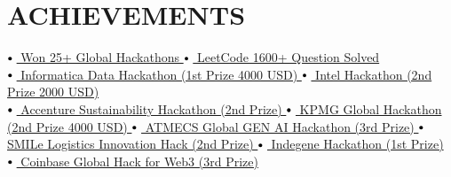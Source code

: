 \documentclass[letterpaper,10pt]{article}
\newcommand\sbullet[1][.5]{\mathbin{\vcenter{\hbox{\scalebox{#1}{$\bullet$}}}}}
\begin{document}
\section{ACHIEVEMENTS}
\noindent

$\sbullet[.75] \hspace{0.1cm}${\href{https://www.hackerearth.com/@raj713335/}{ Won 25+ Global Hackathons \faExternalLink}} \hspace{4.4cm}
$\sbullet[.75] \hspace{0.1cm}${\href{https://leetcode.com/u/raj713335/}{ LeetCode 1600+ Question Solved \faExternalLink}} \\
$\sbullet[.75] \hspace{0.1cm}${\href{https://hack2skill.com/hack/informatica-deh-2024}{ Informatica Data Hackathon (1st Prize 4000 USD) \faExternalLink}} \hspace{1.05cm}
$\sbullet[.75] \hspace{0.1cm}${\href{https://www.hackerearth.com/challenges/hackathon/intel-oneapi-hackathon-for-open-innovation/}{ Intel Hackathon (2nd Prize 2000 USD) \faExternalLink}} \\
$\sbullet[.75] \hspace{0.1cm}${\href{https://www.hackerearth.com/challenges/hackathon/accenture-laterals-2/}{ Accenture Sustainability Hackathon (2nd Prize) \faExternalLink}} \hspace{1.5cm}
$\sbullet[.75] \hspace{0.1cm}${\href{https://www.hackerearth.com/challenges/hackathon/kpmgs-fullstack-azure-hiring-challenge/}{ KPMG Global Hackathon (2nd Prize 4000 USD) \faExternalLink}} \hspace{1.5cm}
$\sbullet[.75] \hspace{0.1cm}${\href{https://www.hackerearth.com/challenges/hackathon/atmecs-hackathon-2024/}{ ATMECS Global GEN AI Hackathon (3rd Prize) \faExternalLink}} \hspace{1.3cm}
$\sbullet[.75] \hspace{0.1cm}${\href{https://www.hackerearth.com/challenges/hackathon/smile-logistics-innovation-hack/}{ SMILe Logistics Innovation Hack (2nd Prize) \faExternalLink}} \hspace{1.6cm}
$\sbullet[.75] \hspace{0.1cm}${\href{https://www.hackerearth.com/challenges/hackathon/indegene-hackathon/}{ Indegene Hackathon (1st Prize) \faExternalLink}} \hspace{4.05cm}
$\sbullet[.75] \hspace{0.1cm}${\href{https://buidl-the-future.hackerearth.com/}{ Coinbase Global Hack for Web3 (3rd Prize) \faExternalLink}} \hspace{1.6cm}
\end{document}

